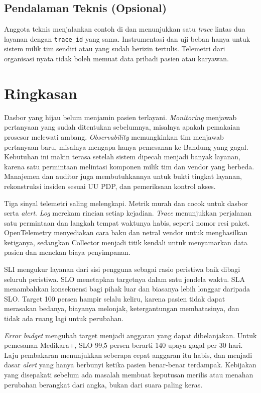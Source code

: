 \subsection*{Pendalaman Teknis (Opsional)}

Anggota teknis menjalankan contoh di  dan
menunjukkan satu \textit{trace} lintas dua layanan dengan \texttt{trace\_id} yang sama.
Instrumentasi dan uji beban hanya untuk sistem milik tim sendiri atau yang sudah berizin
tertulis. Telemetri dari organisasi nyata tidak boleh memuat data pribadi pasien atau karyawan.

\section{Ringkasan}

Dasbor yang hijau belum menjamin pasien terlayani. \textit{Monitoring} menjawab pertanyaan yang
sudah ditentukan sebelumnya, misalnya apakah pemakaian prosesor melewati ambang. \textit{Observability}
memungkinkan tim menjawab pertanyaan baru, misalnya mengapa hanya pemesanan ke Bandung yang gagal.
Kebutuhan ini makin terasa setelah sistem dipecah menjadi banyak layanan, karena satu permintaan
melintasi komponen milik tim dan vendor yang berbeda. Manajemen dan auditor juga membutuhkannya
untuk bukti tingkat layanan, rekonstruksi insiden sesuai UU PDP, dan pemeriksaan kontrol akses.

Tiga sinyal telemetri saling melengkapi. Metrik murah dan cocok untuk dasbor serta \textit{alert}.
\textit{Log} merekam rincian setiap kejadian. \textit{Trace} menunjukkan perjalanan satu permintaan
dan langkah tempat waktunya habis, seperti nomor resi paket. OpenTelemetry menyediakan cara baku
dan netral vendor untuk menghasilkan ketiganya, sedangkan Collector menjadi titik kendali untuk
menyamarkan data pasien dan menekan biaya penyimpanan.

SLI mengukur layanan dari sisi pengguna sebagai rasio peristiwa baik dibagi seluruh peristiwa. SLO
menetapkan targetnya dalam satu jendela waktu. SLA menambahkan konsekuensi bagi pihak luar dan
biasanya lebih longgar daripada SLO. Target 100 persen hampir selalu keliru, karena pasien tidak
dapat merasakan bedanya, biayanya melonjak, ketergantungan membatasinya, dan tidak ada ruang lagi
untuk perubahan.

\textit{Error budget} mengubah target menjadi anggaran yang dapat dibelanjakan. Untuk pemesanan
Medikara+, SLO 99,5 persen berarti 140 upaya gagal per 30 hari. Laju pembakaran menunjukkan
seberapa cepat anggaran itu habis, dan menjadi dasar \textit{alert} yang hanya berbunyi ketika
pasien benar-benar terdampak. Kebijakan yang disepakati sebelum ada masalah membuat keputusan
merilis atau menahan perubahan berangkat dari angka, bukan dari suara paling keras.

